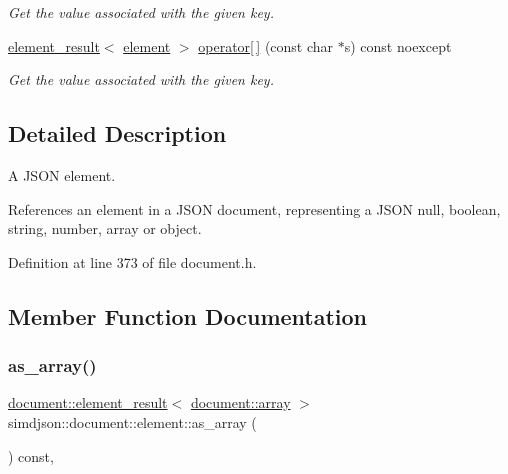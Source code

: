 \begin{DoxyCompactItemize}
\begin{DoxyCompactList}\small\item\em Get the value associated with the given key. \end{DoxyCompactList}\item 
\hyperlink{classsimdjson_1_1document_1_1element__result}{element\+\_\+result}$<$ \hyperlink{classsimdjson_1_1document_1_1element}{element} $>$ \hyperlink{classsimdjson_1_1document_1_1element_a1e7407d751420bcd130d90d838034492}{operator\mbox{[}$\,$\mbox{]}} (const char $\ast$s) const noexcept
\begin{DoxyCompactList}\small\item\em Get the value associated with the given key. \end{DoxyCompactList}\end{DoxyCompactItemize}


\subsection{Detailed Description}
A J\+S\+ON element. 

References an element in a J\+S\+ON document, representing a J\+S\+ON null, boolean, string, number, array or object. 

Definition at line 373 of file document.\+h.



\subsection{Member Function Documentation}
\mbox{\label{classsimdjson_1_1document_1_1element_afbd5b1b6a674a2e38ba5267c6999579c}} 
\subsubsection{\texorpdfstring{as\+\_\+array()}{as\_array()}}
{\footnotesize\ttfamily \hyperlink{classsimdjson_1_1document_1_1element__result}{document\+::element\+\_\+result}$<$ \hyperlink{classsimdjson_1_1document_1_1array}{document\+::array} $>$ simdjson\+::document\+::element\+::as\+\_\+array (\begin{DoxyParamCaption}{ }\end{DoxyParamCaption}) const\hspace{0.3cm}{\ttfamily [inline]}, {\ttfamily [noexcept]}}



